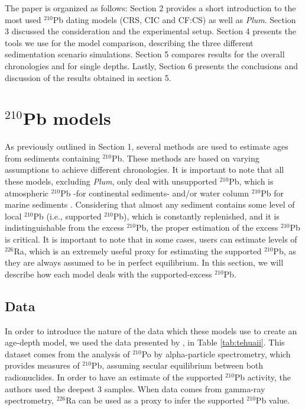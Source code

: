 \documentclass [10pt] {article}
\begin{document}
	The paper is organized as follows: 
Section 2 provides a short introduction to the most used $^{210}$Pb dating models (CRS, CIC and CF:CS) as well as \textit{Plum}.
Section 3 discussed the consideration and the experimental setup.
Section 4 presents the tools we use for the model comparison, describing the three different sedimentation scenario simulations.
Section 5 compares results for the overall chronologies and for single depths.
Lastly, Section 6 presents the conclusions and discussion of the results obtained in section 5. 

\section{$^{210}$Pb models}

	As previously outlined in Section 1, several methods are used to estimate ages from sediments containing $^{210}$Pb.  
These methods are based on varying assumptions to achieve different chronologies. 
It is important to note that all these models, excluding \textit{Plum}, only deal with unsupported $^{210}$Pb, which is atmospheric $^{210}$Pb -for continental sediments- and/or water column $^{210}$Pb for marine sediments . 
Considering that almost any sediment contains some level of local $^{210}$Pb (i.e., supported $^{210}$Pb), which is constantly replenished, and it is indistinguishable from the excess $^{210}$Pb, the proper estimation of the excess $^{210}$Pb is critical.  
It is important to note that in some cases, users can estimate levels of $^{226}$Ra, which is an extremely useful proxy for estimating the supported $^{210}$Pb, as they are always assumed to be in perfect equilibrium.
In this section, we will describe how each model deals with the supported-excess $^{210}$Pb.

\subsection{Data}

	In order to introduce the nature of the data which these models use to create an age-depth model, we used the data presented by  \citet{Sanchez-Cabeza2012}, in Table \ref{tab:tehuaii}.
This dataset comes from the analysis of $^{210}$Po by alpha-particle spectrometry, which provides measures of $^{210}$Pb, assuming secular equilibrium between both radionuclides. In order to have an estimate of the supported $^{210}$Pb activity, the authors used the deepest 3 samples. When data comes from gamma-ray spectrometry, $^{226}$Ra can be used as a proxy to infer the supported $^{210}$Pb value.  
\end{document}
